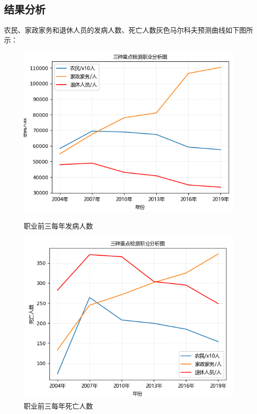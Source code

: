 \documentclass{whutmod}
\begin{document}
\subsection{结果分析}
农民、家政家务和退休人员的发病人数、死亡人数灰色马尔科夫预测曲线如下图所示：
	\begin{figure}[H]
	\begin{minipage}[t]{0.5\linewidth}
		\centering
		\includegraphics[width=\textwidth]{figures/Figure_6.png}
		\caption{职业前三每年发病人数}\label{sanrenf}
	\end{minipage}
	\hfill%
	\begin{minipage}[t]{0.5\linewidth}
		\centering
		\includegraphics[width=\textwidth]{figures/sannrens.png}
		\caption{职业前三每年死亡人数}\label{sannrens}
	\end{minipage}
\end{figure}
\end{document}
